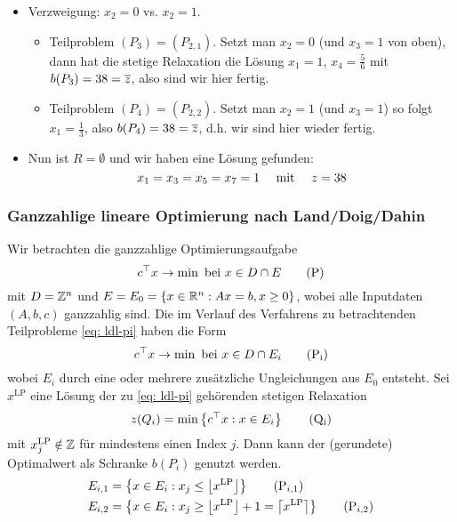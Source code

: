 \begin{beispiel}
\begin{itemize}[leftmargin=*]
\begin{itemize}
		\end{itemize}
		\item Verzweigung: $x_2 = 0$ vs. $x_2 = 1$.
		\begin{itemize}
			\item Teilproblem $(P_3) = (P_{2,1})$. Setzt man $x_2 = 0$ (und $x_3 = 1$ von oben), dann hat die stetige Relaxation die Lösung $x_1 = 1$, $x_4 = \frac{5}{6}$ mit $b(P_3) = 38 = \quer{z}$, also sind wir hier fertig.
			\item Teilproblem $(P_4) = (P_{2,2})$. Setzt man $x_2 = 1$ (und $x_3 = 1$) so folgt $x_1 = \frac{1}{3}$, also $b(P_4) = 38 = \quer{z}$, d.h. wir sind hier wieder fertig.
		\end{itemize}
		\item Nun ist $R = \emptyset$ und wir haben eine Lösung gefunden:
		\begin{equation*}
			x_1 = x_3 = x_5 = x_7 = 1 \quad \mit \quad z = 38
		\end{equation*}
	\end{itemize}
\end{beispiel}




\subsubsection{Ganzzahlige lineare Optimierung nach Land/Doig/Dahin}

Wir betrachten die ganzzahlige Optimierungsaufgabe 
\begin{equation*}
	\trans{c}x  \to \min \bei x \in D \cap E
	\tag{P} \label{eq: ldl-p}
\end{equation*}
mit $D = \Z^n$ und $E = E_0 = \menge{x \in \Rn: Ax = b, x \ge 0}$, wobei alle Inputdaten $(A,b,c)$ ganzzahlig sind. Die im Verlauf des Verfahrens zu betrachtenden Teilprobleme \eqref{eq: ldl-pi} haben die Form
\begin{equation*}
	\trans{c} x \to \min \bei x \in D \cap E_i
	\tag{P${}_\text{i}$} \label{eq: ldl-pi}
\end{equation*}
wobei $E_i$ durch eine oder mehrere zusätzliche Ungleichungen aus $E_0$ entsteht. Sei $x^{\text{LP}}$ eine Lösung der zu \eqref{eq: ldl-pi} gehörenden stetigen Relaxation
\begin{equation*}
	z(Q_i) = \min \menge{\trans{c} x : x \in E_i} 
	\tag{Q${}_\text{i}$} \label{eq: ldl-qi}
\end{equation*}
mit $x^{\text{LP}}_j \notin \Z$ für mindestens einen Index $j$. Dann kann der (gerundete) Optimalwert als Schranke $b(P_i)$ genutzt werden.
\begin{align*}
	E_{i,1} &= \menge{x \in E_i : x_j \le \left\lfloor x^{\text{LP}} \right\rfloor}
	\tag{P${}_{i,1}$} \\
	E_{i,2} &= \menge{x \in E_i : x_j \ge \left\lfloor x^{\text{LP}} \right\rfloor + 1 = \left\lceil x^{\text{LP}} \right\rceil} 
	\tag{P${}_{i,2}$}	
\end{align*}

